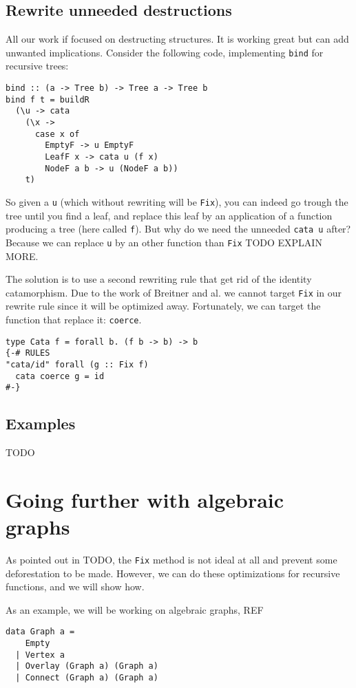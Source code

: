 \documentclass[format=sigplan]{acmart}
\newcommand{\minline}[1]{\texttt{#1}}
\begin{document}
\subsection{Rewrite unneeded destructions}
All our work if focused on destructing structures. It is working great but can add unwanted implications. Consider the following code, implementing \minline{bind} for recursive trees:

\begin{verbatim}
bind :: (a -> Tree b) -> Tree a -> Tree b
bind f t = buildR
  (\u -> cata
    (\x ->
      case x of
        EmptyF -> u EmptyF
        LeafF x -> cata u (f x)
        NodeF a b -> u (NodeF a b))
    t)
\end{verbatim}

So given a \minline{u} (which without rewriting will be \minline{Fix}), you can indeed go trough the tree until you find a leaf, and replace this leaf by an application of a function producing a tree (here called \minline{f}). But why do we need the unneeded \minline{cata u} after? Because we can replace \minline{u} by an other function than \minline{Fix} TODO EXPLAIN MORE.

The solution is to use a second rewriting rule that get rid of the identity catamorphism. Due to the work of Breitner and al. \cite{Breitner:2014:SZC:2692915.2628141} we cannot target \minline{Fix} in our rewrite rule since it will be optimized away. Fortunately, we can target the function that replace it: \minline{coerce}.

\begin{verbatim}
type Cata f = forall b. (f b -> b) -> b
{-# RULES
"cata/id" forall (g :: Fix f)
  cata coerce g = id
#-}
\end{verbatim}

\subsection{Examples}
TODO

\section{Going further with algebraic graphs}
As pointed out in TODO, the \verb|Fix| method is not ideal at all and prevent some deforestation to be made.
However, we can do these optimizations for recursive functions, and we will show how.

As an example, we will be working on algebraic graphs, REF
\begin{verbatim}
data Graph a =
    Empty
  | Vertex a
  | Overlay (Graph a) (Graph a)
  | Connect (Graph a) (Graph a)
\end{verbatim}
\end{document}
